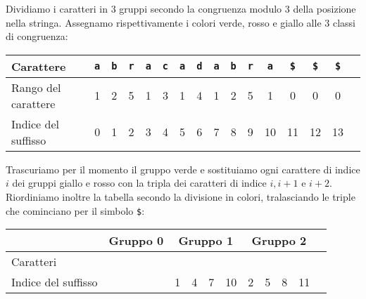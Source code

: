 Dividiamo i caratteri in \(3\) gruppi secondo la congruenza modulo \(3\) della 
posizione nella stringa. Assegnamo rispettivamente i colori verde, rosso e giallo 
alle \(3\) classi di congruenza:
\begin{table}[h]
  \begin{tabular}{l*{14}{c}r}
    Carattere              & \texttt{a} & \texttt{b} & \texttt{r} & \texttt{a}
                           & \texttt{c} & \texttt{a} & \texttt{d} & \texttt{a}
                           & \texttt{b} & \texttt{r} & \texttt{a} & \texttt{\$}
                           & \texttt{\$} & \texttt{\$} \\
    \hline
    Rango del carattere    & 1 & 2 & 5 & 1 & 3 & 1 & 4 & 1 & 2 & 5 & 1 & 0 & 0 & 0 \\
    Indice del suffisso    & 0 \cellcolor{green} & 1 \cellcolor{red} & 2 \cellcolor{yellow} 
                           & 3 \cellcolor{green} & 4 \cellcolor{red} & 5 \cellcolor{yellow} 
                           & 6 \cellcolor{green} & 7 \cellcolor{red} & 8 \cellcolor{yellow} 
                           & 9 \cellcolor{green} & 10 \cellcolor{red} & 11 \cellcolor{yellow} 
                           & 12 \cellcolor{green} & 13 \cellcolor{red} \\
  \end{tabular}
\end{table}

Trascuriamo per il momento il gruppo verde e sostituiamo ogni carattere di indice 
\(i\) dei gruppi giallo e rosso con la tripla dei caratteri di indice \(i, i+1\) e 
\(i+2\). Riordiniamo inoltre la tabella secondo la divisione in colori,
tralasciando le triple che cominciano per il simbolo \texttt{\$}:
\begin{table}[h]
  \begin{tabular}{l*{12}{c}r}
                        & \multicolumn{4}{c}{Gruppo 0 \cellcolor{green} } 
                        & \multicolumn{4}{c}{Gruppo 1 \cellcolor{red} } 
                        & \multicolumn{4}{c}{Gruppo 2 \cellcolor{yellow} }\\
    \hline
    Caratteri           & \multicolumn{12}{c}{} \\
    Indice del suffisso & & & &
                        & 1 & 4 & 7 & 10
                        & 2 & 5 & 8 & 11 \\
  \end{tabular}
\end{table}